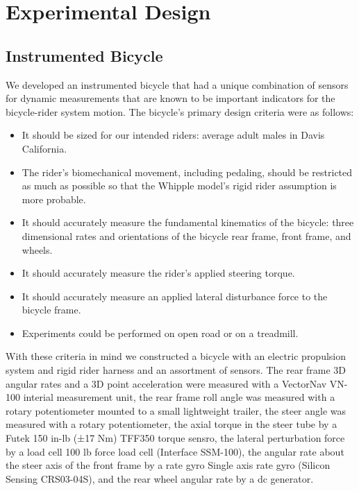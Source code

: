 \documentclass[a4paper]{article}
\begin{document}
\section{Experimental Design}

\subsection{Instrumented Bicycle}
We developed an instrumented bicycle that had a unique combination of sensors
for dynamic measurements that are known to be important indicators for the
bicycle-rider system motion. The bicycle's primary design criteria were as
follows:

\begin{itemize}
  \item It should be sized for our intended riders: average adult males in
    Davis California.
  \item The rider's biomechanical movement, including pedaling, should be
    restricted as much as possible so that the Whipple model's rigid rider
    assumption is more probable.
  \item It should accurately measure the fundamental kinematics of the bicycle:
    three dimensional rates and orientations of the bicycle rear frame, front
    frame, and wheels.
  \item It should accurately measure the rider's applied steering torque.
  \item It should accurately measure an applied lateral disturbance force to
    the bicycle frame.
  \item Experiments could be performed on open road or on a treadmill.
\end{itemize}

With these criteria in mind we constructed a bicycle with an electric
propulsion system and rigid rider harness and an assortment of sensors. The
rear frame 3D angular rates and a 3D point acceleration were measured with a
VectorNav VN-100 interial measurement unit, the rear frame roll angle was
measured with a rotary potentiometer mounted to a small lightweight trailer,
the steer angle was measured with a rotary potentiometer, the axial torque in
the steer tube by a Futek 150 in-lb (±17 Nm) TFF350 torque sensro, the lateral
perturbation force by a load cell 100 lb force load cell (Interface SSM-100),
the angular rate about the steer axis of the front frame by a rate gyro Single
axis rate gyro (Silicon Sensing CRS03-04S), and the rear wheel angular rate by
a dc generator.
\end{document}
